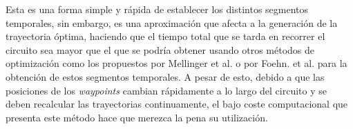 Esta es una forma simple y rápida de establecer los distintos segmentos temporales, sin embargo, es una aproximación que afecta a la generación de la trayectoria óptima, haciendo que el tiempo total que se tarda en recorrer el circuito sea mayor que el que se podría obtener usando otros métodos de optimización como los propuestos por Mellinger et al. \cite{MinimunSnap2011} o por Foehn. et al. \cite{foehn2020cpc}  para la obtención de estos segmentos temporales. A pesar de esto, debido a que las posiciones de los \textit{waypoints} cambian rápidamente a lo largo del circuito y se deben recalcular las trayectorias continuamente, el bajo coste computacional que presenta este método hace que merezca la pena su utilización.


